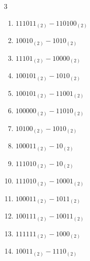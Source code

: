 \begin{multicols}{3}
\begin{enumerate}
  \item $111011_{(2)} - 110100_{(2)}$


  \item $10010_{(2)} - 1010_{(2)}$


  \item $11101_{(2)} - 10000_{(2)}$


  \item $100101_{(2)} - 1010_{(2)}$


  \item $100101_{(2)} - 11001_{(2)}$


  \item $100000_{(2)} - 11010_{(2)}$


  \item $10100_{(2)} - 1010_{(2)}$


\columnbreak %

  \item $100011_{(2)} - 10_{(2)}$


  \item $111010_{(2)} - 10_{(2)}$


  \item $111010_{(2)} - 10001_{(2)}$


  \item $100011_{(2)} - 1011_{(2)}$


  \item $100111_{(2)} - 10011_{(2)}$


  \item $111111_{(2)} - 1000_{(2)}$


  \item $10011_{(2)} - 1110_{(2)}$


\end{enumerate}
\end{multicols}
